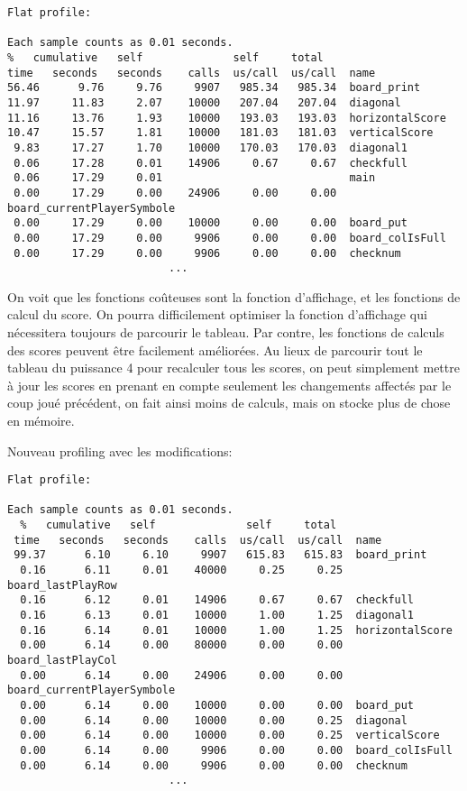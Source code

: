 \documentclass{article}
\begin{document}
\begin{scriptsize}
\begin{lstlisting}
Flat profile:

Each sample counts as 0.01 seconds.
%   cumulative   self              self     total           
time   seconds   seconds    calls  us/call  us/call  name    
56.46      9.76     9.76     9907   985.34   985.34  board_print
11.97     11.83     2.07    10000   207.04   207.04  diagonal
11.16     13.76     1.93    10000   193.03   193.03  horizontalScore
10.47     15.57     1.81    10000   181.03   181.03  verticalScore
 9.83     17.27     1.70    10000   170.03   170.03  diagonal1
 0.06     17.28     0.01    14906     0.67     0.67  checkfull
 0.06     17.29     0.01                             main
 0.00     17.29     0.00    24906     0.00     0.00  board_currentPlayerSymbole
 0.00     17.29     0.00    10000     0.00     0.00  board_put
 0.00     17.29     0.00     9906     0.00     0.00  board_colIsFull
 0.00     17.29     0.00     9906     0.00     0.00  checknum
                         ...
\end{lstlisting}
\end{scriptsize}

On voit que les fonctions coûteuses sont la fonction d'affichage, et les fonctions de calcul du score. On pourra difficilement optimiser la fonction d'affichage qui nécessitera toujours de parcourir le tableau. Par contre, les fonctions de calculs des scores peuvent être facilement améliorées. Au lieux de parcourir tout le tableau du puissance 4 pour recalculer tous les scores, on peut simplement mettre à jour les scores en prenant en compte seulement les changements affectés par le coup joué précédent, on fait ainsi moins de calculs, mais on stocke plus de chose en mémoire.

Nouveau profiling avec les modifications:

\begin{scriptsize}
\begin{lstlisting}
Flat profile:

Each sample counts as 0.01 seconds.
  %   cumulative   self              self     total           
 time   seconds   seconds    calls  us/call  us/call  name    
 99.37      6.10     6.10     9907   615.83   615.83  board_print
  0.16      6.11     0.01    40000     0.25     0.25  board_lastPlayRow
  0.16      6.12     0.01    14906     0.67     0.67  checkfull
  0.16      6.13     0.01    10000     1.00     1.25  diagonal1
  0.16      6.14     0.01    10000     1.00     1.25  horizontalScore
  0.00      6.14     0.00    80000     0.00     0.00  board_lastPlayCol
  0.00      6.14     0.00    24906     0.00     0.00  board_currentPlayerSymbole
  0.00      6.14     0.00    10000     0.00     0.00  board_put
  0.00      6.14     0.00    10000     0.00     0.25  diagonal
  0.00      6.14     0.00    10000     0.00     0.25  verticalScore
  0.00      6.14     0.00     9906     0.00     0.00  board_colIsFull
  0.00      6.14     0.00     9906     0.00     0.00  checknum
                         ...
\end{lstlisting}
\end{scriptsize}
\end{document}
